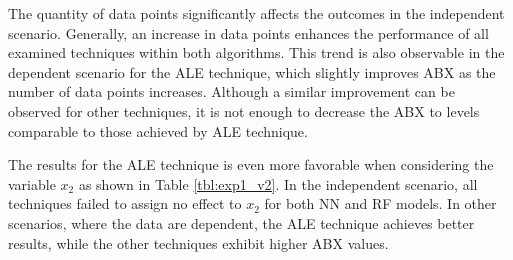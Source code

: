 The quantity of data points significantly affects the outcomes in the independent scenario. Generally, an increase in data points enhances the performance of all examined techniques within both algorithms. This trend is also observable in the dependent scenario for the \gls{ALE} technique, which slightly improves \gls{ABX} as the number of data points increases. Although a similar improvement can be observed for other techniques, it is not enough to decrease the \gls{ABX} to levels comparable to those achieved by \gls{ALE} technique.

The results for the \gls{ALE} technique is even more favorable when considering the variable $x_2$ as shown in Table \ref{tbl:exp1_v2}. In the independent scenario, all techniques failed to assign no effect to $x_2$ for both \gls{NN} and \gls{RF} models. In other scenarios, where the data are dependent, the \gls{ALE} technique achieves better results, while the other techniques exhibit higher \gls{ABX} values. 




